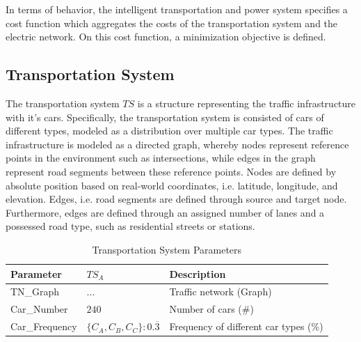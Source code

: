
In terms of behavior, the intelligent transportation and power system specifies a cost function which aggregates the costs of the transportation system and the electric network. On this cost function, a minimization objective is defined.

\subsection{Transportation System}

The transportation system $TS$ is a structure representing the traffic infrastructure with it's cars. Specifically, the transportation system is consisted of cars of different types, modeled as a distribution over multiple car types. The traffic infrastructure is modeled as a directed graph, whereby nodes represent reference points in the environment such as intersections, while edges in the graph represent road segments between these reference points. Nodes are defined by absolute position based on real-world coordinates, i.e. latitude, longitude, and elevation. Edges, i.e. road segments are defined through source and target node. Furthermore, edges are defined through an assigned number of lanes and a possessed road type, such as residential streets or stations.

\begin{table}[h]
	\renewcommand{\arraystretch}{1.3}
	\caption{Transportation System Parameters}
	\centering
	\begin{tabular}{lll}
		\hline
		\textbf{Parameter}     & \textbf{$TS_{A}$}         & \textbf{Description} \\ \hline
		TN\_Graph              & $...$    & Traffic network (Graph)    \\
		Car\_Number            & $240$    & Number of cars (\#)      \\ 
		Car\_Frequency      & $\{C_{A},C_{B},C_{C}\}:0.\overline{3}$    & Frequency of different car types (\%)       \\ \hline
	\end{tabular}
\end{table}

